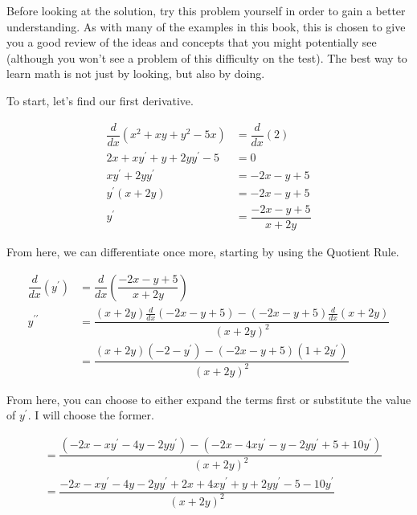 \begin{tip}
    Before looking at the solution, try this problem yourself in order to gain a better understanding. As with many of the examples in this book, this is chosen to give you a good review of the ideas and concepts that you might potentially see (although you won't see a problem of this difficulty on the test). The best way to learn math is not just by looking, but also by doing.
\end{tip}

To start, let's find our first derivative.

\begin{align}
    \dfrac{d}{dx} \left( x^2 + xy + y^2 - 5x \right) &= \dfrac{d}{dx} \left( 2 \right) \\
    2x + xy^\prime + y + 2yy^\prime - 5 &= 0 \\
    xy^\prime + 2yy^\prime &= -2x - y + 5 \\
    y^\prime \left( x + 2y \right) &= -2x - y + 5 \\
    y^\prime &= \dfrac{-2x - y + 5}{x + 2y}
\end{align}

From here, we can differentiate once more, starting by using the Quotient Rule.

\begin{align}
    \dfrac{d}{dx} \left( y^\prime \right) &= \dfrac{d}{dx} \left( \dfrac{-2x - y + 5}{x + 2y} \right) \\
    y^{\prime \prime} &= \dfrac{\left( x + 2y \right) \frac{d}{dx} \left( -2x - y + 5 \right) - \left( -2x - y + 5 \right) \frac{d}{dx} \left( x + 2y \right) }{\left( x + 2y \right)^2} \\
    &= \dfrac{\left( x + 2y \right) \left( -2 - y^\prime \right) - \left( -2x - y + 5 \right) \left( 1 + 2y^\prime \right) }{\left( x + 2y \right)^2}
\end{align}

From here, you can choose to either expand the terms first or substitute the value of \( y^\prime \). I will choose the former.

\begin{align}
    &= \dfrac{\left( -2x - xy^\prime - 4y - 2yy^\prime \right) - \left( -2x - 4xy^\prime - y - 2yy^\prime + 5 + 10y^\prime \right)}{\left( x + 2y \right)^2} \\
    &= \dfrac{-2x - xy^\prime - 4y - 2yy^\prime + 2x + 4xy^\prime + y + 2yy^\prime - 5 - 10y^\prime}{\left( x + 2y \right)^2}
\end{align}

